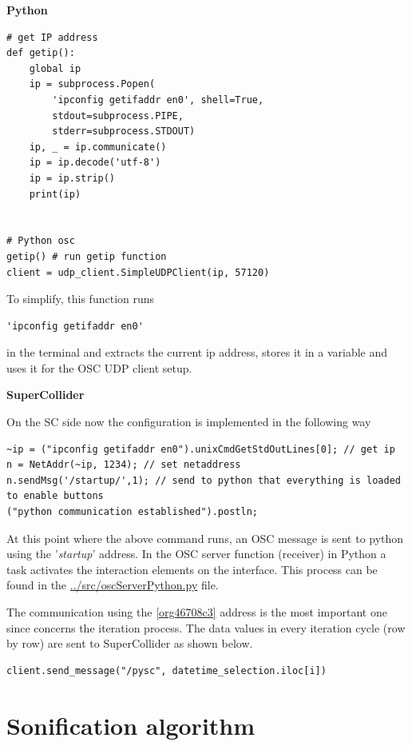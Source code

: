 \documentclass[11pt]{article}
\begin{document}
\textbf{Python}

\begin{verbatim}
# get IP address
def getip():
    global ip
    ip = subprocess.Popen(
        'ipconfig getifaddr en0', shell=True,
        stdout=subprocess.PIPE,
        stderr=subprocess.STDOUT)
    ip, _ = ip.communicate()
    ip = ip.decode('utf-8')
    ip = ip.strip()
    print(ip)


# Python osc
getip() # run getip function
client = udp_client.SimpleUDPClient(ip, 57120)
\end{verbatim}

To simplify, this function runs
\begin{verbatim}
'ipconfig getifaddr en0'
\end{verbatim}
in the terminal and extracts the current ip address, stores it in a variable and uses it for the OSC UDP client setup.

\textbf{SuperCollider}

On the SC side now the configuration is implemented in the following way
\begin{verbatim}
~ip = ("ipconfig getifaddr en0").unixCmdGetStdOutLines[0]; // get ip
n = NetAddr(~ip, 1234); // set netaddress
n.sendMsg('/startup/',1); // send to python that everything is loaded to enable buttons
("python communication established").postln;
\end{verbatim}

At this point where the above command runs, an OSC message is sent to python using the '\emph{startup}' address.  In the OSC server function (receiver) in Python a task activates the interaction elements on the interface.  This process can be found in the \url{../src/oscServerPython.py} file.

The communication using the \ref{org46708c3} address is the most important one since concerns the iteration process.  The data values in every iteration cycle (row by row) are sent to SuperCollider as shown below.

\begin{verbatim}
client.send_message("/pysc", datetime_selection.iloc[i])
\end{verbatim}
\section{Sonification algorithm}
\label{sec:org0be3a6b}
\end{document}
